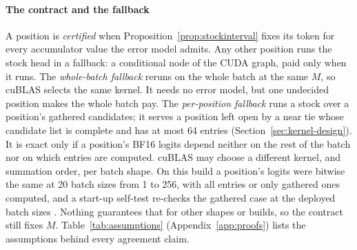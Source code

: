 \paragraph{The contract and the fallback} A position is \emph{certified} when Proposition~\ref{prop:stockinterval} fixes its \Rstock{} token for every accumulator value the error model admits. Any other position runs the stock head in a fallback: a conditional node of the CUDA graph, paid only when it runs. The \emph{whole-batch fallback} reruns  on the whole batch at the same $M$, so cuBLAS selects the same kernel. It needs no error model, but one undecided position makes the whole batch pay. The \emph{per-position fallback} runs a stock  over a position's gathered candidates; it serves a position left open by a near tie whose candidate list is complete and has at most 64 entries (Section~\ref{sec:kernel-design}). It is exact only if a position's BF16 logits depend neither on the rest of the batch nor on which entries are computed. cuBLAS may choose a different kernel, and summation order, per batch shape. On this build a position's logits were bitwise the same at 20 batch sizes from 1 to 256, with all entries or only gathered ones computed, and a start-up self-test re-checks the gathered case at the deployed batch sizes . Nothing guarantees that for other shapes or builds, so the contract still fixes $M$. Table~\ref{tab:assumptions} (Appendix~\ref{app:proofs}) lists the assumptions behind every agreement claim\label{sec:assumptions}.
